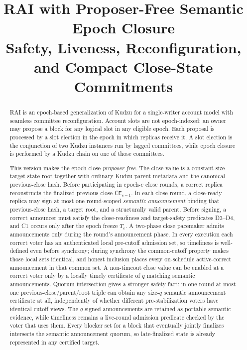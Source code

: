 \documentclass[11pt]{article}
\title{RAI with Proposer-Free Semantic Epoch Closure\\
\large Safety, Liveness, Reconfiguration, and Compact Close-State Commitments}
\author{}
\date{}
\theoremstyle{definition}
\theoremstyle{remark}
\newcommand{\CE}{\mathsf{CE}}
\begin{document}
\maketitle

\begin{abstract}
RAI is an epoch-based generalization of Kudzu for a single-writer account model with seamless committee reconfiguration. Account slots are not epoch-indexed: an owner may propose a block for any logical slot in any eligible epoch. Each proposal is processed by a slot election in the epoch in which replicas receive it. A slot election is the conjunction of two Kudzu instances run by lagged committees, while epoch closure is performed by a Kudzu chain on one of those committees.

This version makes the epoch close \emph{proposer-free}. The close value is a constant-size target-state root together with ordinary Kudzu parent metadata and the canonical previous-close hash. Before participating in epoch-$e$ close rounds, a correct replica reconstructs the finalized previous close $\CE_{e-1}$. In each close round, a close-ready replica may sign at most one round-scoped \emph{semantic announcement} binding that previous-close hash, a target root, and a structurally valid parent. Before signing, a correct announcer must satisfy the close-readiness and target-safety predicates D3--D4, and C1 occurs only after the epoch freeze $T_e$. A two-phase close pacemaker admits announcements only during the round's announcement phase. In every execution each correct voter has an authenticated local pre-cutoff admission set, so timeliness is well-defined even before synchrony; during synchrony the common-cutoff property makes those local sets identical, and honest inclusion places every on-schedule active-correct announcement in that common set. A non-timeout close value can be enabled at a correct voter only by a locally timely certificate of $q$ matching semantic announcements. Quorum intersection gives a stronger safety fact: in one round at most one previous-close/parent/root triple can obtain any size-$q$ semantic announcement certificate at all, independently of whether different pre-stabilization voters have identical cutoff views. The $q$ signed announcements are retained as portable semantic evidence, while timeliness remains a live-round admission predicate checked by the voter that uses them. Every blocker set for a block that eventually jointly finalizes intersects the semantic announcement quorum, so late-finalized state is already represented in any certified target.


\end{abstract}
\end{document}
